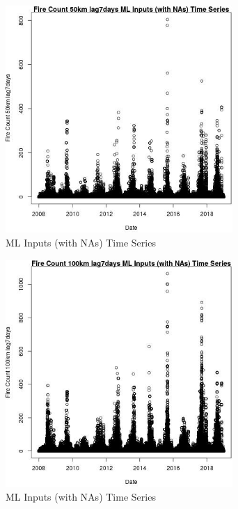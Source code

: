 \begin{figure} 
\centering  
\includegraphics[width=0.77\textwidth]{Code_Outputs/Report_ML_input_PM25_Step4_part_f_de_duplicated_aveswNAs_Fire_Count_50km_lag7daysvDate.jpg} 
\caption{\label{fig:Report_ML_input_PM25_Step4_part_f_de_duplicated_aveswNAsFire_Count_50km_lag7daysvDate}ML Inputs (with NAs) Time Series} 
\end{figure} 
 

\begin{figure} 
\centering  
\includegraphics[width=0.77\textwidth]{Code_Outputs/Report_ML_input_PM25_Step4_part_f_de_duplicated_aveswNAs_Fire_Count_100km_lag7daysvDate.jpg} 
\caption{\label{fig:Report_ML_input_PM25_Step4_part_f_de_duplicated_aveswNAsFire_Count_100km_lag7daysvDate}ML Inputs (with NAs) Time Series} 
\end{figure} 
 

